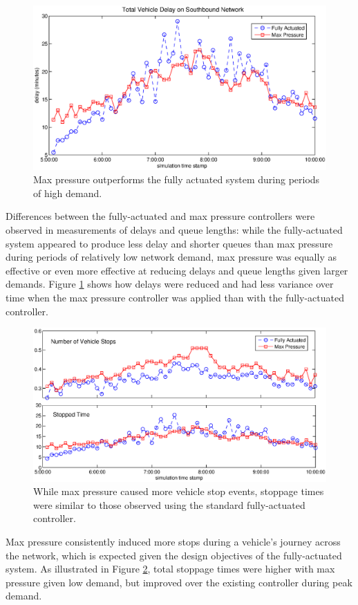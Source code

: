 \begin{figure}[h!]
\vspace{-.5em}
\centering
\includegraphics[width=\columnwidth]{./VehicleDelayPlot.eps}
\vspace{-2em}
\caption{Max pressure outperforms the fully actuated system during periods of high demand.\label{fig_delay}}
\vspace{-1em}
\end{figure}

Differences between the fully-actuated and max pressure controllers were observed in measurements of delays and queue lengths: while the fully-actuated system appeared to produce less delay and shorter queues than max pressure during periods of relatively low network demand, max pressure was equally as effective or even more effective at reducing delays and queue lengths given larger demands. Figure \ref{fig_delay} shows how delays were reduced and had less variance over time when the max pressure controller was applied than with the fully-actuated controller. 
\begin{figure}[h!]
\centering
\includegraphics[width=\columnwidth]{./VehicleStopsPlot.eps}
\vspace{-2.5em}
\caption{While max pressure caused more vehicle stop events, stoppage times were similar to those observed using the standard fully-actuated controller.\label{fig_stops}}
\end{figure}

Max pressure consistently induced more stops during a vehicle's journey across the network, which is expected given the design objectives of the fully-actuated system. As illustrated in Figure \ref{fig_stops}, total stoppage times were higher with max pressure given low demand, but improved over the existing controller during peak demand. 

